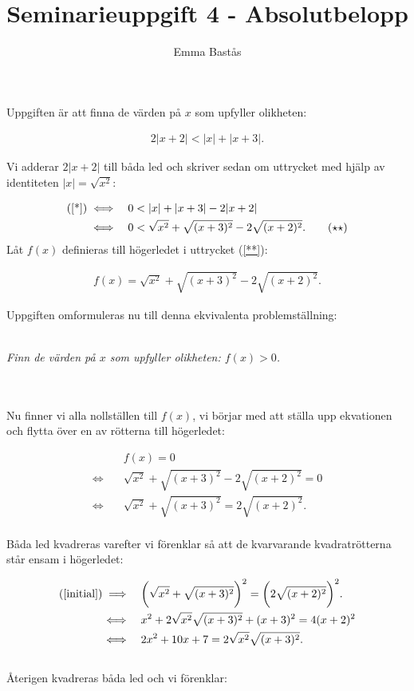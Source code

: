 \documentclass{article}
\title{Seminarieuppgift 4 - Absolutbelopp}
\author{Emma Bastås}
\begin{document}
\maketitle

\noindent Uppgiften är att finna de värden på $x$ som upfyller olikheten:

\begin{gather*}
  2|x+2| < |x| + |x+3|\text{.} \label{*}\tag{$\star$}
\end{gather*}

\noindent Vi adderar $2|x+2|$ till båda led och skriver sedan om uttrycket med hjälp av identiteten $|x| = \sqrt{x^{2}}$:

\begin{align*}
  \text{(\ref{*})} \iff& \quad 0 < |x| + |x + 3| - 2|x+2| \\
  \iff& \quad 0 < \sqrt{x^{2}} + \sqrt{(x + 3)^{2}} - 2 \sqrt{(x + 2)^{2}}\text{.} \label{**}\tag{$\star\star$}
\end{align*}
\noindent Låt $f(x)$ definieras till högerledet i uttrycket (\ref{**}):

\begin{gather*}
  f(x) =  \sqrt{x^{2}} + \sqrt{(x + 3)^{2}} - 2 \sqrt{(x + 2)^{2}}\text{.}
\end{gather*}

\noindent Uppgiften omformuleras nu till denna ekvivalenta problemställning:
\\
\\
\centerline{\emph{Finn de värden på $x$ som upfyller olikheten: $f(x) > 0$.}}
\\
\\
Nu finner vi alla nollställen till $f(x)$, vi börjar med att ställa upp ekvationen och flytta över en av rötterna till högerledet:

\begin{align}
  \quad & f(x) = 0 \nonumber\\
  \iff \quad &\sqrt{x^{2}} + \sqrt{(x + 3)^{2}} - 2 \sqrt{(x + 2)^{2}} = 0 \nonumber\\
  \iff \quad &\sqrt{x^{2}} + \sqrt{(x + 3)^{2}} = 2 \sqrt{(x + 2)^{2}}\text{.} \label{initial}
\end{align}
\\
Båda led kvadreras varefter vi förenklar så att de kvarvarande kvadratrötterna står ensam i högerledet:

\begin{align}
  \text{(\ref{initial})} \implies \quad & \biggl(\sqrt{x^{2}} + \sqrt{(x + 3)^{2}}\biggr)^{2} = \biggl(2 \sqrt{(x + 2)^{2}}\biggr)^{2}\text{.} \nonumber\\
  \iff \quad & x^{2} + 2\sqrt{x^{2}}\sqrt{(x+3)^{2}} + (x + 3)^{2} = 4(x+2)^{2} \nonumber\\
  \iff \quad & 2x^{2} + 10x + 7 = 2\sqrt{x^{2}}\sqrt{(x+3)^{2}}\text{.} \label{squared}
\end{align}
\\
Återigen kvadreras båda led och vi förenklar:
\end{document}
